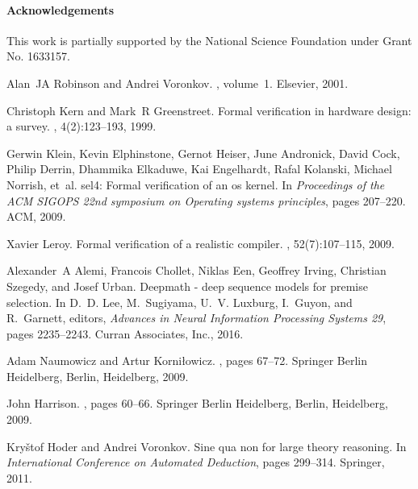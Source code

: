 \documentclass{article}
\begin{document}
\paragraph{Acknowledgements}
This work is partially supported by the National Science Foundation under Grant No. 1633157.

\small
\begin{thebibliography}{10}

Alan~JA Robinson and Andrei Voronkov.
, volume~1.
\newblock Elsevier, 2001.

Christoph Kern and Mark~R Greenstreet.
\newblock Formal verification in hardware design: a survey.
, 4(2):123--193, 1999.

Gerwin Klein, Kevin Elphinstone, Gernot Heiser, June Andronick, David Cock,
  Philip Derrin, Dhammika Elkaduwe, Kai Engelhardt, Rafal Kolanski, Michael
  Norrish, et~al.
\newblock sel4: Formal verification of an os kernel.
\newblock In {\em Proceedings of the ACM SIGOPS 22nd symposium on Operating
  systems principles}, pages 207--220. ACM, 2009.

Xavier Leroy.
\newblock Formal verification of a realistic compiler.
, 52(7):107--115, 2009.

Alexander~A Alemi, Francois Chollet, Niklas Een, Geoffrey Irving, Christian
  Szegedy, and Josef Urban.
\newblock Deepmath - deep sequence models for premise selection.
\newblock In D.~D. Lee, M.~Sugiyama, U.~V. Luxburg, I.~Guyon, and R.~Garnett,
  editors, {\em Advances in Neural Information Processing Systems 29}, pages
  2235--2243. Curran Associates, Inc., 2016.

Adam Naumowicz and Artur Korni{\l}owicz.
, pages 67--72.
\newblock Springer Berlin Heidelberg, Berlin, Heidelberg, 2009.

John Harrison.
, pages 60--66.
\newblock Springer Berlin Heidelberg, Berlin, Heidelberg, 2009.

Kry{\v{s}}tof Hoder and Andrei Voronkov.
\newblock Sine qua non for large theory reasoning.
\newblock In {\em International Conference on Automated Deduction}, pages
  299--314. Springer, 2011.


\end{thebibliography}
\end{document}
